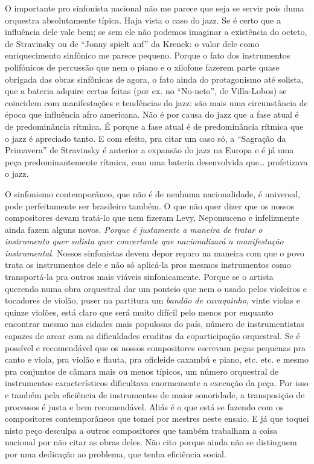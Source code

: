 O importante pro sinfonista nacional não me parece que seja se servir
pois duma orquestra absolutamente típica. Haja vista o caso do jazz. Se
é certo que a influência dele vale bem; se sem ele não podemos imaginar
a existência do octeto, de Stravinsky ou de ``Jonny spielt auf'' da
Krenek: o valor dele como enriquecimento sinfônico me parece pequeno.
Porque o fato dos instrumentos polifónicos de percussão que nem o piano
e o xilofone fazerem parte quase obrigada das obras sinfônicas de agora,
o fato ainda do protagonismo até solista, que a bateria adquire certas
feitas (por ex. no ``No-neto'', de Villa-Lobos) se coincidem com
manifestações e tendências do jazz: são mais uma circunstância de época
que influência afro americana. Não é por causa do jazz que a fase atual
é de predominância rítmica. É porque a fase atual é de predominância
rítmica que o jazz é apreciado tanto. E com efeito, pra citar um caso
só, a ``Sagração da Primavera'' de Stravinsky é anterior a expansão do
jazz na Europa e é já uma peça predominantemente rítmica, com uma
bateria desenvolvida que\ldots{} profetizava o jazz.

O sinfonismo contemporâneo, que não é de nenhuma nacionalidade, é
universal, pode perfeitamente ser brasileiro também. O que não quer
dizer que os nossos compositores devam tratá-lo que nem fizeram Levy,
Nepomuceno e infelizmente ainda fazem alguns novos. \textit{Porque é
justamente a maneira de tratar o instrumento quer solista quer
concertante que nacionalizará a manifestação instrumental.} Nossos
sinfonistas devem depor reparo na maneira com que o povo trata os
instrumentos dele e não só aplicá-la pros mesmos instrumentos como
transportá-la pra outros mais viáveis sinfonicamente. Porque se o
artista querendo numa obra orquestral dar um ponteio que nem o usado
pelos violeiros e tocadores de violão, puser na partitura um
\textit{bandão de cavaquinho}, vinte violas e quinze violões, está claro
que será muito difícil pelo menos por enquanto encontrar mesmo nas
cidades mais populosas do país, número de instrumentistas capazes de
arcar com as dificuldades eruditas da coparticipação orquestral. Se é
possível e recomendável que os nossos compositores escrevam peças
pequenas pra canto e viola, pra violão e flauta, pra oficleide caxambú e
piano, etc. etc. e mesmo pra conjuntos de câmara mais ou menos típicos,
um número orquestral de instrumentos característicos dificultava
enormemente a execução da peça. Por isso e também pela eficiência de
instrumentos de maior sonoridade, a transposição de processos é justa e
bem recomendável. Aliás é o que está se fazendo com os compositores
contemporâneos que tomei por mestres neste ensaio. E já que toquei nisto
peço desculpa a outros compositores que também trabalham a coisa
nacional por não citar as obras deles. Não cito porque ainda não se
distinguem por uma dedicação ao problema, que tenha eficiência social.

